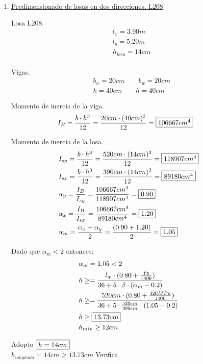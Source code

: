 \begin{enumerate}
\item \underline{Predimensionado de losas en dos direcciones. L208}

Losa L208.
\begin{align*}
& l_x = 3.90m \\
& l_y = 5.20m \\
& h_{losa} = 14cm\\
\end{align*}

Vigas.
\begin{align*}
& b_w = 20cm \qquad b_w = 20cm\\
& h = 40cm \qquad h = 40cm
\end{align*}

Momento de inercia de la viga.
\begin{align*}
& I_{B} = \frac{b \cdot h^3}{12} = \frac{20cm \cdot (40cm)^3}{12} = \framebox{$106667cm^4$}
\end{align*}

Momento de inercia de la losa.
\begin{align*}
& I_{sy} = \frac{b \cdot h^3}{12} = \frac{520cm \cdot (14cm)^3}{12} = \framebox{$118907cm^4$}\\
& I_{sx} = \frac{b \cdot h^3}{12} = \frac{390cm \cdot (14cm)^3}{12} = \framebox{$89180cm^4$}\\
& \alpha_y = \frac{I_B}{I_{sy}} = \frac{106667cm^4}{118907cm^4} = \framebox{$0.90$} \\
& \alpha_x = \frac{I_B}{I_{sx}} = \frac{106667cm^4}{89180cm^4} = \framebox{$1.20$}\\
& \alpha_m = \frac{\alpha_x+\alpha_y}{2} = \frac{(0.90+1.20)}{2} = \framebox{$1.05$}
\end{align*}

\newpage
Dado que $\alpha_m < 2 $ entonces:
\begin{align*}
& \alpha_m = 1.05 < 2 \\
& h \geq = \frac{l_w \cdot (0.80+ \frac{fy}{1400})}{36+ 5 \cdot \beta \cdot (\alpha_m - 0.2)} \\
& h \geq = \frac{520cm \cdot (0.80+ \frac{420MPa}{1400})}{36+ 5 \cdot \frac{520cm}{390cm} \cdot (1.05 - 0.2)} \\
& h \geq \framebox{$13.73cm$} \\
& h_{min} \geq 12cm
\end{align*}

Adopto $\framebox{$h = 14cm$}$ \\
$h_{adoptado} = 14 cm \geq 13.73cm$ Verifica \\


\end{enumerate}
